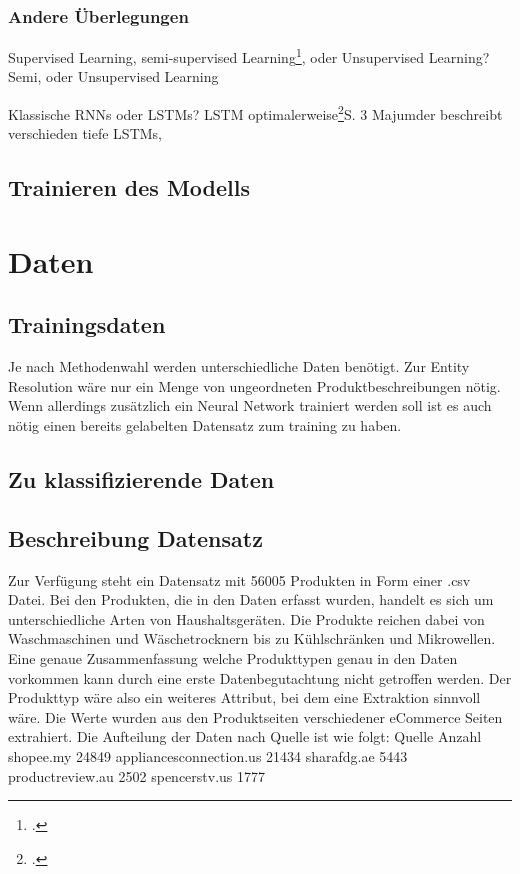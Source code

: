 \documentclass[paper=a4,12pt,listof=totoc]{scrartcl}%
\begin{document}
	\subsubsection{Andere Überlegungen}
	Supervised Learning, semi-supervised Learning\footcite{Ghani.2006}, oder Unsupervised Learning? Semi, oder Unsupervised Learning
	
	Klassische RNNs oder LSTMs? LSTM optimalerweise\footcite{Majumder.30.03.2018}{S. 3} Majumder beschreibt verschieden tiefe LSTMs, 
	\subsection{Trainieren des Modells}
	
	\section{Daten}
	\subsection{Trainingsdaten}
	Je nach Methodenwahl werden unterschiedliche Daten benötigt. Zur Entity Resolution wäre nur ein Menge von ungeordneten Produktbeschreibungen nötig. Wenn allerdings zusätzlich ein Neural Network trainiert werden soll ist es auch nötig einen bereits gelabelten Datensatz zum training zu haben.
	\subsection{Zu klassifizierende Daten}
	\subsection{Beschreibung Datensatz}
		Zur Verfügung steht ein Datensatz mit 56005 Produkten in Form einer .csv Datei. Bei den Produkten, die in den Daten erfasst wurden, handelt es sich um unterschiedliche Arten von Haushaltsgeräten. Die Produkte reichen dabei von Waschmaschinen und Wäschetrocknern bis zu Kühlschränken und Mikrowellen. Eine genaue Zusammenfassung welche Produkttypen genau in den Daten vorkommen kann durch eine erste Datenbegutachtung nicht getroffen werden. Der Produkttyp wäre also ein weiteres Attribut, bei dem eine Extraktion sinnvoll wäre.
		Die Werte wurden aus den Produktseiten verschiedener eCommerce Seiten extrahiert. Die Aufteilung der Daten nach Quelle ist wie folgt:
		Quelle	Anzahl
		shopee.my	24849
		appliancesconnection.us	21434
		sharafdg.ae	5443
		productreview.au	2502
		spencerstv.us	1777
		
\end{document}
